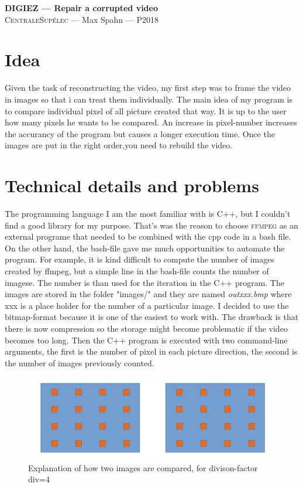 \documentclass[12pt,oneside,a4paper]{article}
\begin{document}
\begin{center}
{\LARGE \bfseries
 DIGIEZ --- Repair a corrupted video \\[0.3cm]
}
{\large
  \textsc{CentraleSupélec} --- Max Spahn --- P2018\\[0.7cm]
}
\end{center}

\section{Idea}
\label{sec:Idea}
Given the task of reconstructing the video, my first step was to frame the video in images so that i can treat them
individually. The main idea of my program is to compare individual pixel of all picture created that way. It is up 
to the user how many pixels he wants to be compared. An increase in pixel-number increases the accurancy of the 
program but causes a longer execution time. Once the images are put in the right order,you need to rebuild
the video.
\section{Technical details and problems}
\label{sec:Technical details and problems}
The programming language I am the most familiar with is C++, but I couldn't find a good library for 
my purpose. That's was the reason to choose \textsc{ffmpeg} as an external programe that needed to be combined with the cpp 
code in a bash file. On the other hand, the bash-file gave me much opportunities to automate the program. For example, 
it is kind difficult to compute the number of images created by ffmpeg, but a simple line in the bash-file counts the 
number of imagese. The number is than used for the iteration in the C++ program. 
The images are stored in the folder "images/" and they are named \textit{outxxx.bmp} where xxx is a place holder for the number
of a particular image. I decided to use the bitmap-format because it is one of the easiest to work with. The drawback is that 
there is now compression so the storage might become problematic if the video becomes too long.
Then the C++ program is executed with two command-line arguments, the first is the number of pixel
in each picture direction, the second is the number of images previously counted.
\begin{figure}
\begin{center}
	\includegraphics[scale=0.3]{explication_image.png}
\end{center}
\caption{Explanation of how two images are compared, for divison-factor div=4}
\label{fig:image}
\end{figure}
\end{document}
